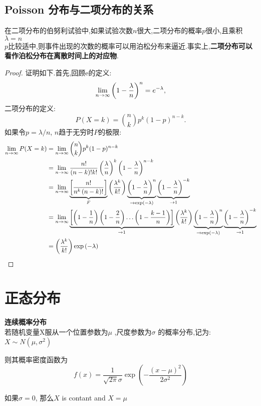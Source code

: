 \documentclass{article}
\begin{document}
\subsection{Poisson 分布与二项分布的关系}
在二项分布的伯努利试验中,如果试验次数$n$很大,二项分布的概率$p$很小,且乘积$\lambda = n$ \\$p$比较适中,则事件出现的次数的概率可以用泊松分布来逼近.事实上,\textbf{二项分布可以看作泊松分布在离散时间上的对应物}.
\begin{proof}
证明如下.首先,回顾e的定义:
$$
\lim _{{n\to \infty }}\left(1-{\lambda  \over n}\right)^{n}=e^{{-\lambda }},
$$
二项分布的定义:
$$
P(X=k)={n \choose k}p^{k}(1-p)^{{n-k}}.
$$
如果令$p=\lambda /n$, $n$趋于无穷时$P$的极限:
$$
\begin{aligned}
\lim_{{n \to \infty }}P(X=k) & =\lim _{{n\to \infty }}{n \choose k}p^{k}(1-p)^{{n-k}}\\
& = \lim _{{n\to \infty }}{n! \over (n-k)!k!}\left({\lambda \over n}\right)^{k}\left(1-{\lambda \over n}\right)^{{n-k}}\\
& = \lim _{{n\to \infty }}\underbrace {\left[{\frac {n!}{n^{k}\left(n-k\right)!}}\right]}_{F}\left({\frac {\lambda ^{k}}{k!}}\right)\underbrace {\left(1-{\frac {\lambda }{n}}\right)^{n}}_{{\to \exp \left(-\lambda \right)}}\underbrace {\left(1-{\frac {\lambda }{n}}\right)^{{-k}}}_{{\to 1}}\\
& = \lim _{{n\to \infty }}\underbrace {\left[\left(1-{\frac {1}{n}}\right)\left(1-{\frac {2}{n}}\right)\ldots \left(1-{\frac {k-1}{n}}\right)\right]}_{{\to 1}}\left({\frac {\lambda ^{k}}{k!}}\right)\underbrace {\left(1-{\frac {\lambda }{n}}\right)^{n}}_{{\to \exp \left(-\lambda \right)}}\underbrace {\left(1-{\frac {\lambda }{n}}\right)^{{-k}}}_{{\to 1}}\\
& = \left({\frac {\lambda ^{k}}{k!}}\right)\exp \left(-\lambda \right)
\end{aligned}
$$
\end{proof}

\section{正态分布}
\textbf{连续概率分布}\\
若随机变量X服从一个位置参数为$\mu$ ,尺度参数为$\sigma$ 的概率分布,记为:$X\sim N(\mu ,\sigma ^{2})$

则其概率密度函数为
$$f(x)=\frac{1}{\sqrt{2\pi} \sigma} \exp({- \dfrac{(x-\mu )^{2}}{2\sigma ^{2}}})$$

如果$\sigma = 0$, 那么$X$ is contant and $X = \mu$
\end{document}
